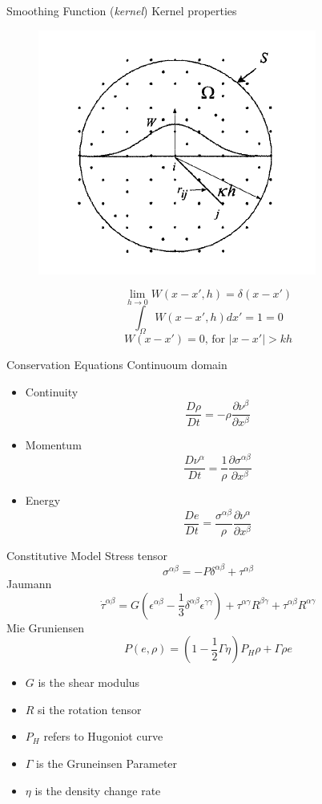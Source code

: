 \documentclass[10pt]{beamer}
\begin{document}
\begin{frame}{Smoothing Function (\textit{kernel})}
Kernel properties
\begin{figure}[h!]
\includegraphics[scale=.5]{./images/ParticleApprox.png}
\end{figure}
$$\lim_{h\to0}{W(x-x',h)}=\delta(x-x')$$
$$\int_{\Omega}W(x-x',h)dx'=1=0$$
$$W(x-x')=0\text{, for }|x-x'|>kh$$
\end{frame}

\begin{frame}{Conservation Equations}
Continuoum domain
\begin{itemize}
\item Continuity
\[\frac{D\rho}{Dt}=-\rho\frac{\partial \nu^\beta}{\partial x^\beta}\]
\item Momentum
\[\frac{D\nu^\alpha}{Dt}=\frac{1}{\rho}\frac{\partial\sigma^{\alpha\beta}}{\partial x^\beta}\]
\item Energy
\[\frac{De}{Dt}=\frac{\sigma^{\alpha\beta}}{\rho}\frac{\partial\nu^\alpha}{\partial x^\beta}\]
\end{itemize}
\end{frame}

\begin{frame}{Constitutive Model}
Stress tensor
\[\sigma^{\alpha\beta}=-P\delta^{\alpha\beta}+\tau^{\alpha\beta}\]
Jaumann
\[\dot{\tau}^{\alpha\beta}=G\left(\epsilon^{\alpha\beta}-\frac{1}{3}\delta^{\alpha\beta}\epsilon^{\gamma\gamma}\right)+\tau^{\alpha\gamma}R^{\beta\gamma} + \tau^{\alpha\beta}R^{\alpha\gamma}\]
Mie Gruniensen
\[P(e,\rho)=\left(1-\frac{1}{2}\Gamma\eta\right)P_H\rho+\Gamma\rho e\]
\begin{itemize}
\item $G$ is the shear modulus
\item $R$ si the rotation tensor
\item $P_H$ refers to Hugoniot curve
\item $\Gamma$ is the Gruneinsen Parameter
\item $\eta$ is the density change rate
\end{itemize}
\end{frame}
\end{document}
